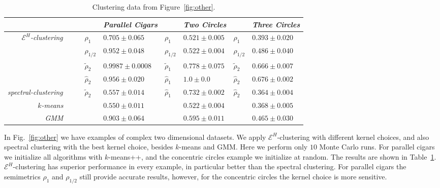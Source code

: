 \documentclass{article}
\newcommand{\xmark}{\ding{55}}
\begin{document}
\begin{table}
\caption{\label{table:other}
Clustering data from Figure~\ref{fig:other}.
}
\begin{center}
\footnotesize{
\begin{tabular}{@{}r  l l  l l  l l@{}}
\toprule[1pt]
 & & \emph{Parallel Cigars}
 & & \emph{Two Circles}
 & & \emph{Three Circles} \\
\midrule[0.5pt]
\multirow{4}{*}{\emph{$\mathcal{E}^H$-clustering~~~~}}
& $\rho_{1}$ & $0.705\pm 0.065$
& $\rho_{1}$ & $0.521\pm 0.005$
& $\rho_{1}$ & $0.393\pm 0.020$ \\
& $\rho_{1/2}$ & $0.952\pm 0.048$
& $\rho_{1/2}$ & $0.522\pm 0.004$
& $\rho_{1/2}$ & $0.486\pm 0.040$ \\
& $\widetilde{\rho}_{2}$ & $\bm{0.9987\pm 0.0008}$
& $\widetilde{\rho}_{1}$ & $0.778\pm 0.075$
& $\widetilde{\rho}_{2}$ & $0.666\pm 0.007$ \\
& $\widehat{\rho}_{2}$  & $0.956\pm 0.020$
& $\widehat{\rho}_{1}$  & $\bm{1.0\pm 0.0}$
& $\widehat{\rho}_{2}$ & $\bm{0.676\pm 0.002}$ \\
\midrule[0.5pt]
\emph{spectral-clustering~~~~}
& $\widetilde{\rho}_{2}$ & $0.557\pm 0.014$ 
& $\widehat{\rho}_{1}$ & $0.732\pm 0.002$ 
& $\widehat{\rho}_{2}$ & $0.364\pm 0.004$  \\
\emph{$k$-means}~~~~ 
& \xmark & $0.550\pm 0.011$
& \xmark & $0.522\pm 0.004$
& \xmark & $0.368\pm 0.005$ \\
\emph{GMM}~~~~
& \xmark & $0.903\pm 0.064$
& \xmark & $0.595\pm 0.011$
& \xmark & $0.465\pm 0.030$ \\
\bottomrule[1pt]
\end{tabular}
}
\end{center}
\end{table}

In Fig.~\ref{fig:other} we have examples of
complex two dimensional datasets. 
We apply $\mathcal{E}^H$-clustering  with different kernel choices,
and also spectral clustering with the best kernel choice, besides 
$k$-means and GMM. Here we perform only $10$ Monte Carlo runs.
For parallel cigars we initialize
all algorithms with $k$-means++, and the concentric circles example
we initialize at random.
The results are shown in Table~\ref{table:other}.
$\mathcal{E}^H$-clustering has superior performance
in every example, in particular better than the
spectral clustering.
For parallel cigars the semimetrics $\rho_1$ and $\rho_{1/2}$ still provide
accurate results, however, for
the concentric circles the kernel choice is more sensitive.
\end{document}
